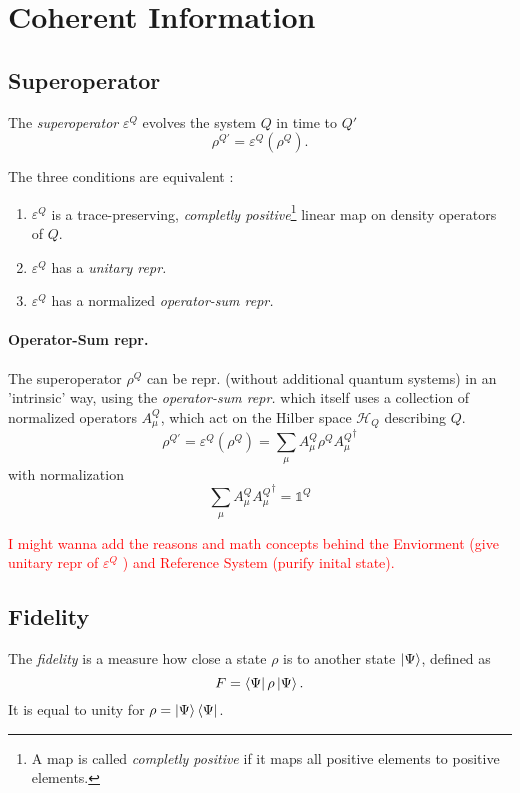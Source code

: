 \section{Coherent Information}

\subsection{Superoperator}
The \textit{superoperator} $\varepsilon^Q$ evolves the system $Q$ in time to $Q'$ \cite{qDataProcessing}
\begin{equation}
    \rho^{Q'} = \varepsilon^Q(\rho^Q).
\end{equation}

The three conditions are equivalent \cite{qDataProcessing}:
\begin{enumerate}
    \item $\varepsilon^Q$ is a trace-preserving, \textit{completly positive}\footnote{
        A map is called \textit{completly positive} if it maps all positive elements to positive elements.
    } linear map on density operators of $Q$.
    \item $\varepsilon^Q$ has a \textit{unitary repr.}
    \item $\varepsilon^Q$ has a normalized \textit{operator-sum repr.}
\end{enumerate}  

\paragraph{Operator-Sum repr.}
The superoperator $\rho^Q$ can be repr. (without additional quantum systems) in an 'intrinsic' way,  
using the \textit{operator-sum repr.} which itself uses a collection of normalized operators $A_\mu^Q$,
which act on the Hilber space $\mathcal{H}_Q$ describing $Q$.  \cite{qDataProcessing}
\begin{equation}
    \rho^{Q'} = \varepsilon^Q (\rho^{Q}) = \sum_\mu A_\mu^Q\rho^{Q} {A_\mu^Q}^\dagger 
\end{equation}
with normalization 
\begin{equation}
    \sum_\mu A_\mu^Q {A_\mu^Q}^\dagger  = \mathds{1}^Q
\end{equation} 

\textcolor{red}{I might wanna add the reasons and math concepts behind the Enviorment (give unitary repr of $\varepsilon^{Q}$ ) and Reference System (purify inital state).}


\subsection{Fidelity}
The \textit{fidelity} is a measure how close a state $\rho$ is to another state $\ket{\Psi}$, defined as 
\begin{equation}
    F = \bra{\Psi} \rho \ket{\Psi}.
\end{equation}
It is equal to unity for $\rho=\ket{\Psi}\bra{\Psi}$. \cite{qDataProcessing}

